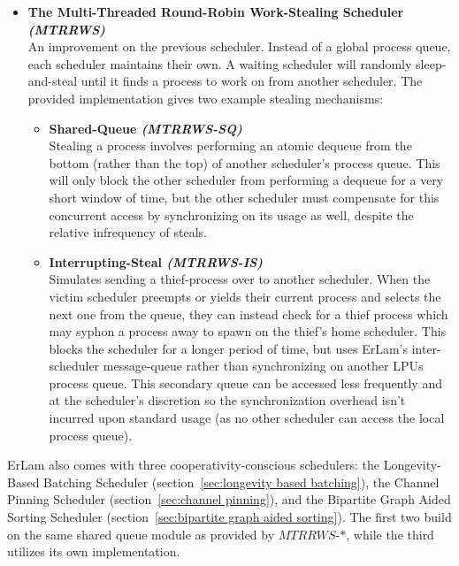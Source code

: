 \begin{itemize}
    \item {\bf The Multi-Threaded Round-Robin Work-Stealing Scheduler {\sl (MTRRWS)}} \\
        An improvement on the previous scheduler. Instead of a global process 
        queue, each scheduler maintains their own. A waiting scheduler will randomly 
        sleep-and-steal until it finds a process to work on from another scheduler. 
        The provided implementation gives two example stealing mechanisms:
        \begin{itemize}
            \item {\bf Shared-Queue {\sl (MTRRWS-SQ)}} \\
                Stealing a process involves performing an atomic dequeue from 
                the bottom (rather than the top) of another scheduler's process 
                queue. This will only block the other scheduler from performing
                a dequeue for a very short window of time, but the other 
                scheduler must compensate for this concurrent access by 
                synchronizing on its usage as well, despite the relative 
                infrequency of steals.
            \item {\bf Interrupting-Steal {\sl (MTRRWS-IS)}} \\
                Simulates sending a thief-process over to another scheduler.
                When the victim scheduler preempts or yields their current process
                and selects the next one from the queue, they can instead check for a
                thief process which may syphon a process away to spawn on the thief's home
                scheduler. This blocks the scheduler for a longer period of time,
                but uses ErLam's inter-scheduler message-queue rather than
                synchronizing on another LPUs process queue. This secondary queue
                can be accessed less frequently and at the scheduler's discretion
                so the synchronization overhead isn't incurred upon standard 
                usage (as no other scheduler can access the local process queue).
        \end{itemize}
\end{itemize}

ErLam also comes with three cooperativity-conscious schedulers: the 
Longevity-Based Batching Scheduler (section~\ref{sec:longevity based batching}),
the Channel Pinning Scheduler (section~\ref{sec:channel pinning}), and the
Bipartite Graph Aided Sorting Scheduler (section~\ref{sec:bipartite graph aided sorting}).
The first two build on the same shared queue module as provided by $MTRRWS$-$*$, 
while the third utilizes its own implementation.

